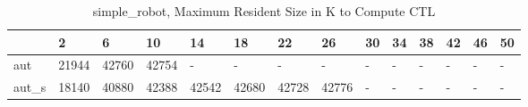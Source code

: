 \begin{table}
\caption{simple_robot, Maximum Resident Size in K to Compute CTL}
\label{simple_robot_CTL_size}
\begin{tabular}{llllllllllllll}
\toprule
 & 2 & 6 & 10 & 14 & 18 & 22 & 26 & 30 & 34 & 38 & 42 & 46 & 50 \\
\midrule
aut & 21944 & 42760 & 42754 & - & - & - & - & - & - & - & - & - & - \\
aut_s & 18140 & 40880 & 42388 & 42542 & 42680 & 42728 & 42776 & - & - & - & - & - & - \\
\bottomrule
\end{tabular}
\end{table}
